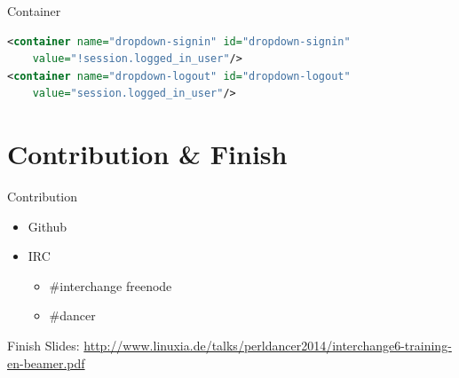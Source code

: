 \begin{frame}[fragile]{Container}
\begin{lstlisting}[language=xml]
<container name="dropdown-signin" id="dropdown-signin" 
    value="!session.logged_in_user"/>
<container name="dropdown-logout" id="dropdown-logout" 
    value="session.logged_in_user"/>
\end{lstlisting}
\end{frame}

\section{Contribution \& Finish}
\begin{frame}{Contribution}
\begin{itemize}
\item Github
\item IRC 
\begin{itemize}
\item \#interchange freenode
\item \#dancer
\end{itemize}
\end{itemize}
\end{frame}

\begin{frame}{Finish}
Slides:
\url{http://www.linuxia.de/talks/perldancer2014/interchange6-training-en-beamer.pdf}
\end{frame}



